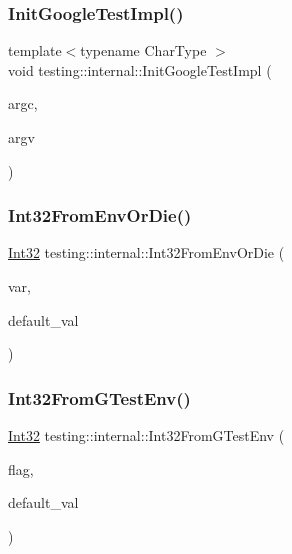 \mbox{\label{namespacetesting_1_1internal_ac3c6fa93391768aa91c6238b31aaeeb5}} 
\subsubsection{\texorpdfstring{InitGoogleTestImpl()}{InitGoogleTestImpl()}}
{\footnotesize\ttfamily template$<$typename Char\+Type $>$ \\
void testing\+::internal\+::\+Init\+Google\+Test\+Impl (\begin{DoxyParamCaption}\item[{int $\ast$}]{argc,  }\item[{Char\+Type $\ast$$\ast$}]{argv }\end{DoxyParamCaption})}

\mbox{\label{namespacetesting_1_1internal_a7e70cddd54da21e2c2608613d51288e2}} 
\subsubsection{\texorpdfstring{Int32FromEnvOrDie()}{Int32FromEnvOrDie()}}
{\footnotesize\ttfamily \mbox{\hyperlink{namespacetesting_1_1internal_a8ee38faaf875f133358abaf9bc056cec}{Int32}} testing\+::internal\+::\+Int32\+From\+Env\+Or\+Die (\begin{DoxyParamCaption}\item[{const char $\ast$}]{var,  }\item[{\mbox{\hyperlink{namespacetesting_1_1internal_a8ee38faaf875f133358abaf9bc056cec}{Int32}}}]{default\+\_\+val }\end{DoxyParamCaption})}

\mbox{\label{namespacetesting_1_1internal_a0f7e728793f9e6cb0aa2b69eaa468bf3}} 
\subsubsection{\texorpdfstring{Int32FromGTestEnv()}{Int32FromGTestEnv()}}
{\footnotesize\ttfamily \mbox{\hyperlink{namespacetesting_1_1internal_a8ee38faaf875f133358abaf9bc056cec}{Int32}} testing\+::internal\+::\+Int32\+From\+G\+Test\+Env (\begin{DoxyParamCaption}\item[{const char $\ast$}]{flag,  }\item[{\mbox{\hyperlink{namespacetesting_1_1internal_a8ee38faaf875f133358abaf9bc056cec}{Int32}}}]{default\+\_\+val }\end{DoxyParamCaption})}


